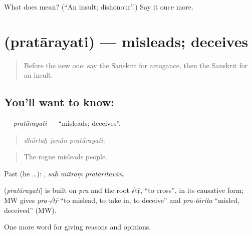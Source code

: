 \begin{tcolorbox}[breakable,colback=teal!4,colframe=teal!35!black,title={Before you move on}]
What does  mean? (\textquotedblleft{}An insult; dishonour\textquotedblright{}.) Say it once more.
\end{tcolorbox}
\section[\texorpdfstring{\sk{प्रतारयति} (pratārayati)}{प्रतारयति (pratārayati)}]{ (pratārayati) — misleads; deceives}

\label{lesson:SA-C360-pratarayati}



\begin{quote}
Before the new one: say the Sanskrit for arrogance, then the Sanskrit for an insult.
\end{quote}

\subsection*{You'll want to know: }
\textbf{} — \emph{pratārayati} — \textquotedblleft{}misleads; deceives\textquotedblright{}.

\begin{quote}
  
\end{quote}

\begin{quote}
\emph{dhūrtaḥ janān pratārayati.}
\end{quote}

\begin{quote}
The rogue misleads people.
\end{quote}

Past (he …):   , \emph{saḥ mitraṃ pratāritavān}.

\begin{cousinweb}
\textbf{} (\emph{pratārayati}) is built on \emph{pra} and the root √tṝ, \textquotedblleft{}to cross\textquotedblright{}, in its causative form; MW gives \emph{pra-√tṝ} \textquotedblleft{}to mislead, to take in, to deceive\textquotedblright{} and \emph{pra-tārita} \textquotedblleft{}misled, deceived\textquotedblright{} (MW).
\end{cousinweb}

\begin{grammarlens}[title={What you've built}]
One more word for giving reasons and opinions.
\end{grammarlens}

